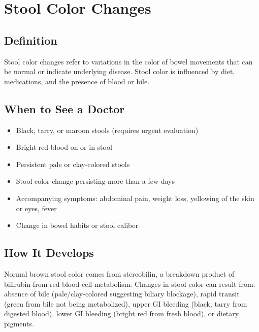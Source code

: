 \chapter{Stool Color Changes}

\section*{Definition}
Stool color changes refer to variations in the color of bowel movements that can be normal or indicate underlying disease. Stool color is influenced by diet, medications, and the presence of blood or bile.

\section*{When to See a Doctor}
\begin{itemize}
\item Black, tarry, or maroon stools (requires urgent evaluation)
\item Bright red blood on or in stool
\item Persistent pale or clay-colored stools
\item Stool color change persisting more than a few days
\item Accompanying symptoms: abdominal pain, weight loss, yellowing of the skin or eyes, fever
\item Change in bowel habits or stool caliber
\end{itemize}

\section*{How It Develops}
Normal brown stool color comes from stercobilin, a breakdown product of bilirubin from red blood cell metabolism. Changes in stool color can result from: absence of bile (pale/clay-colored suggesting biliary blockage), rapid transit (green from bile not being metabolized), upper GI bleeding (black, tarry from digested blood), lower GI bleeding (bright red from fresh blood), or dietary pigments.

